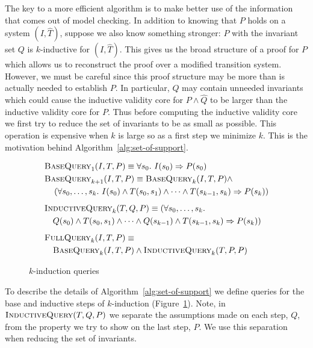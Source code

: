 The key to a more efficient algorithm is to make better use of the
information that comes out of model checking. In addition to knowing
that $P$ holds on a system $(I, \widehat T)$, suppose we also know
something stronger: $P$ with the invariant set $Q$ is $k$-inductive
for $(I, \widehat T)$. This gives us the broad structure of a proof
for $P$ which allows us to reconstruct the proof over a modified
transition system. However, we must be careful since this proof
structure may be more than is actually needed to establish $P$. In
particular, $Q$ may contain unneeded invariants which could cause the
inductive validity core for $P \land \widehat Q$ to be larger than the inductive validity core for $P$. Thus before computing the inductive validity core we first try
to reduce the set of invariants to be as small as possible. This
operation is expensive when $k$ is large so as a first step we
minimize $k$. This is the motivation behind
Algorithm~\ref{alg:set-of-support}.

\begin{figure}
\begin{align*}
  &\bq_1(I, T, P) \equiv \forall s_0.~ I(s_0) \Rightarrow P(s_0) \\
  &\bq_{k+1}(I, T, P) \equiv \bq_k(I, T, P) \land~ \\
%
  &\hspace{10pt}\left(\forall s_0, \ldots, s_k.~ I(s_0) \land T(s_0,
  s_1) \land \cdots \land T(s_{k-1}, s_k) \Rightarrow P(s_k)\right)
  \\[5pt]
  &\iq_k(T, Q, P) \equiv (\forall s_0, \ldots, s_k.~\\
%
  &\hspace{10pt} Q(s_0) \land T(s_0,
  s_1) \land \cdots \land Q(s_{k-1}) \land T(s_{k-1}, s_k) \Rightarrow
  P(s_k)) \\[5pt]
  &\fq_k(I, T, P) \equiv \\
%
  &\hspace{10pt}\bq_k(I, T, P) \land \iq_k(T, P, P)
\end{align*}
\caption{$k$-induction queries}
\label{fig:queries}
\end{figure}

To describe the details of Algorithm~\ref{alg:set-of-support} we
define queries for the base and inductive steps of $k$-induction
(Figure~\ref{fig:queries}). Note, in $\textsc{InductiveQuery}(T, Q, P)$ we separate the
assumptions made on each step, $Q$, from the property we try to show
on the last step, $P$. We use this separation when reducing the set of
invariants.

